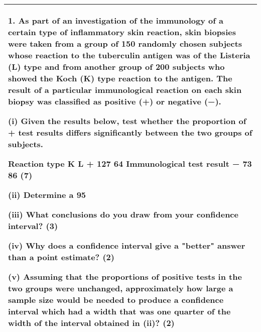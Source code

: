 \documentclass[a4paper,12pt]{article}
\begin{document}
\begin{table}[ht!]
 \centering
 \begin{tabular}{|p{15cm}|}
 \hline  
1. As part of an investigation of the immunology of a certain type of inflammatory skin reaction, skin biopsies were taken from a group of 150 randomly chosen subjects whose reaction to the tuberculin antigen was of the Listeria (L) type and from another group of 200 subjects who showed the Koch (K) type reaction to the antigen.  The result of a particular immunological reaction on each skin biopsy was classified as positive (+) or negative (−). 
 
(i) Given the results below, test whether the proportion of + test results differs significantly between the two groups of subjects. 
 
Reaction type  K L + 127 64 Immunological  test result − 73 86 
(7) 
 
(ii) Determine a 95%
 
(iii) What conclusions do you draw from your confidence interval? 
(3) 
 
(iv) Why does a confidence interval give a "better" answer than a point estimate? (2) 
 
(v) Assuming that the proportions of positive tests in the two groups were unchanged, approximately how large a sample size would be needed to produce a confidence interval which had a width that was one quarter of the width of the interval obtained in (ii)? (2) \\ \hline
  \end{tabular}
\end{table}
\end{document}
